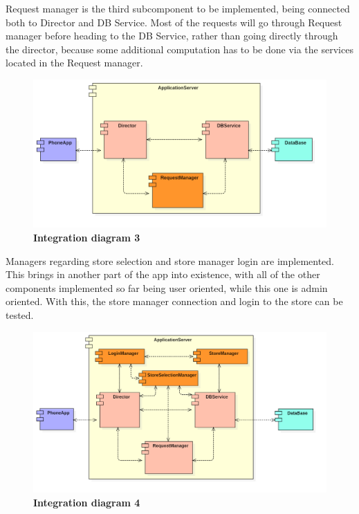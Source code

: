  

Request manager is the third subcomponent to be implemented, being connected both to Director and DB Service. Most of the requests will go through Request manager before heading to the DB Service, rather than going directly through the director, because some additional computation has to be done via the services located in the Request manager. 

 
\begin{figure}[!h]
\centering
\includegraphics[width=\textwidth]{Images/IntegrationDiagram3}
\caption{\label{fig:imp3}\textbf{Integration diagram 3}}
\end{figure}

 

Managers regarding store selection and store manager login are implemented. This brings in another part of the app into existence, with all of the other components implemented so far being user oriented, while this one is admin oriented. With this, the store manager connection and login to the store can be tested. 

 
\begin{figure}[!h]
\centering
\includegraphics[width=\textwidth]{Images/IntegrationDiagram4}
\caption{\label{fig:imp4}\textbf{Integration diagram 4}}
\end{figure}
 

